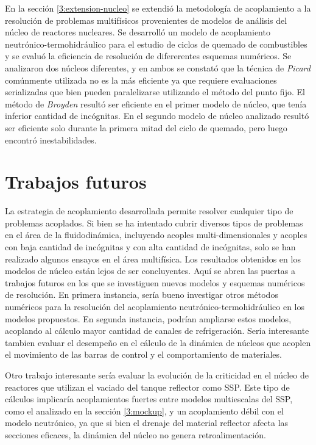 En la sección \ref{3:extension-nucleo} se extendió la metodología de acoplamiento a la resolución de problemas multifísicos provenientes de modelos de análisis del núcleo de reactores nucleares.
Se desarrolló un modelo de acoplamiento neutrónico-termohidráulico para el estudio de ciclos de quemado de combustibles y se evaluó la eficiencia de resolución de difererentes esquemas numéricos.
Se analizaron dos núcleos diferentes, y en ambos se constató que la técnica de \textit{Picard} comúnmente utilizada no es la más eficiente ya que requiere evaluaciones serializadas
que bien pueden paralelizarse utilizando el método del punto fijo.
El método de \textit{Broyden} resultó ser eficiente en el primer modelo de núcleo, que tenía inferior cantidad de incógnitas.
En el segundo modelo de núcleo analizado resultó ser eficiente solo durante la primera mitad del ciclo de quemado, pero luego encontró inestabilidades.

\section{Trabajos futuros}
\label{trabajos-futuros}

La estrategia de acoplamiento desarrollada permite resolver cualquier tipo de problemas acoplados.
Si bien se ha intentado cubrir diversos tipos de problemas en el área de la fluidodinámica,
incluyendo acoples multi-dimensionales y acoples con baja cantidad de incógnitas y con alta cantidad de incógnitas,
solo se han realizado algunos ensayos en el área multifísica.
Los resultados obtenidos en los modelos de núcleo están lejos de ser concluyentes.
Aquí se abren las puertas a trabajos futuros en los que se investiguen nuevos modelos y esquemas numéricos de resolución.
En primera instancia, sería bueno investigar otros métodos numéricos para la resolución del acoplamiento neutrónico-termohidráulico en los modelos propuestos.
En segunda instancia, podrían ampliarse estos modelos, acoplando al cálculo mayor cantidad de canales de refrigeración.
Sería interesante tambien evaluar el desempeño en el cálculo de la dinámica de núcleos que acoplen el movimiento de las barras de control y el comportamiento de materiales.

Otro trabajo interesante sería evaluar la evolución de la criticidad en el núcleo de reactores que utilizan el vaciado del tanque reflector como SSP.
Este tipo de cálculos implicaría acoplamientos fuertes entre modelos multiescalas del SSP, como el analizado en la sección \ref{3:mockup},
y un acoplamiento débil con el modelo neutrónico, ya que si bien el drenaje del material reflector afecta las secciones eficaces,
la dinámica del núcleo no genera retroalimentación.

